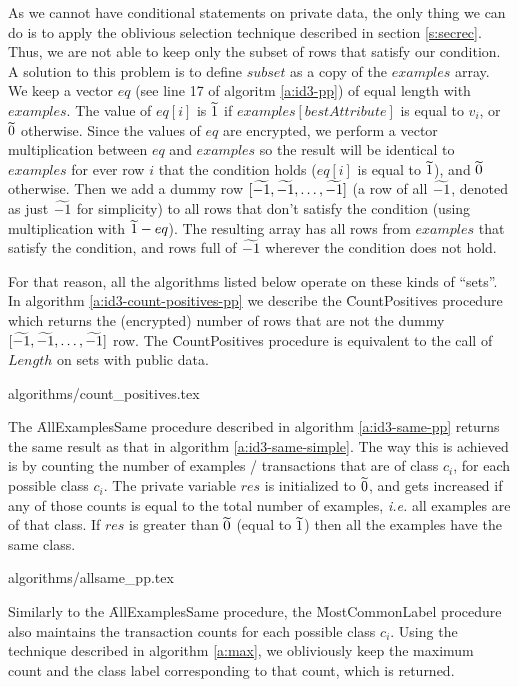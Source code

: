 As we cannot have conditional statements on private data, the only thing we can do is to apply the oblivious selection technique described in section \ref{s:secrec}.
Thus, we are not able to keep only the subset of rows that satisfy our condition.
A solution to this problem is to define $subset$ as a copy of the $examples$ array.
We keep a vector $eq$ (see line 17 of algoritm \ref{a:id3-pp}) of equal length with $examples$.
The value of $eq[i]$ is $\widetilde{1}$ if $examples[bestAttribute]$ is equal to $v_i$, or $\widetilde{0}$ otherwise.
Since the values of $eq$ are encrypted, we perform a vector multiplication between $eq$ and $examples$ so the result will be identical to $examples$ for ever row $i$ that the condition holds ($eq[i]$ is equal to $\widetilde{1}$), and $\widetilde{0}$ otherwise.
Then we add a dummy row $[\widetilde{-1}, \widetilde{-1}, \dots, \widetilde{-1}]$ (a row of all $\widetilde{-1}$, denoted as just $\widetilde{-1}$ for simplicity) to all rows that don't satisfy the condition (using multiplication with $\widetilde{1} - eq$).
The resulting array has all rows from $examples$ that satisfy the condition, and rows full of $\widetilde{-1}$ wherever the condition does not hold.

For that reason, all the algorithms listed below operate on these kinds of ``sets''.
In algorithm \ref{a:id3-count-positives-pp} we describe the \f{CountPositives} procedure which returns the (encrypted) number of rows that are not the dummy $[\widetilde{-1}, \widetilde{-1}, \dots, \widetilde{-1}]$ row.
The \f{CountPositives} procedure is equivalent to the call of $Length$ on sets with public data.


{algorithms/count_positives.tex}

The \f{AllExamplesSame} procedure described in algorithm \ref{a:id3-same-pp} returns the same result as that in algorithm \ref{a:id3-same-simple}.
The way this is achieved is by counting the number of examples / transactions that are of class $c_i$, for each possible class $c_i$.
The private variable $res$ is initialized to $\widetilde{0}$, and gets increased if any of those counts is equal to the total number of examples, \textit{i.e.} all examples are of that class.
If $res$ is greater than $\widetilde{0}$ (equal to $\widetilde{1}$) then all the examples have the same class.

{algorithms/allsame_pp.tex}

Similarly to the \f{AllExamplesSame} procedure, the \f{MostCommonLabel} procedure also maintains the transaction counts for each possible class $c_i$.
Using the technique described in algorithm \ref{a:max}, we obliviously keep the maximum count and the class label corresponding to that count, which is returned.

